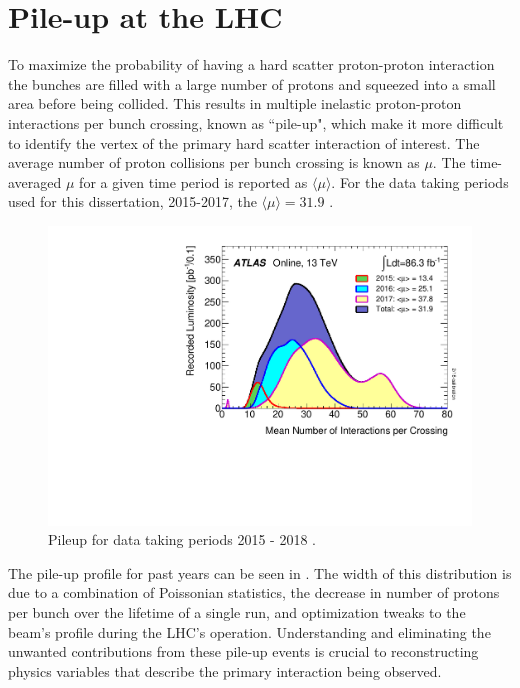 \section{Pile-up at the LHC} \label{sec:lhc:pileup}

To maximize the probability of having a hard scatter proton-proton interaction
the bunches are filled with a large number of protons and squeezed into a small
area before being collided.  This results in multiple inelastic proton-proton
interactions per bunch crossing, known as ``pile-up", which make it more
difficult to identify the vertex of the primary hard scatter interaction of
interest.  The average number of proton collisions per bunch crossing is known
as $\mu$.  The time-averaged $\mu$ for a given time period is reported as
$\langle \mu \rangle$.  For the data taking periods used for this dissertation,
2015-2017, the $\langle \mu \rangle = 31.9$ \cite{LuminosityPublicResultsRun2}.

\begin{figure}[!htbp] 
  \begin{center}
    \includegraphics[width=0.9\linewidth]{figures/lhc/pileup.pdf}
    \caption{ Pileup for data taking periods 2015 - 2018 \cite{LuminosityPublicResultsRun2}.} 
    \label{fig:pileup} 
  \end{center} 
\end{figure}

The pile-up profile for past years can be seen in .  The width
of this distribution is due to a combination of Poissonian statistics, the
decrease in number of protons per bunch over the lifetime of a single run, and
optimization tweaks to the beam's profile during the LHC's operation.
Understanding and eliminating the unwanted contributions from these pile-up
events is crucial to reconstructing physics variables that describe the primary
interaction being observed.
